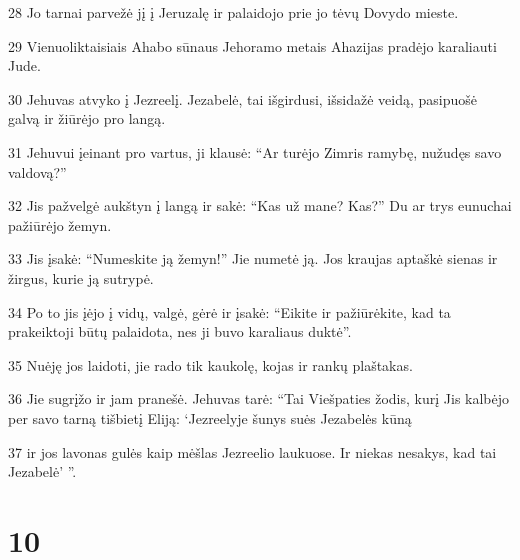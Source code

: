 \par 28 Jo tarnai parvežė jį į Jeruzalę ir palaidojo prie jo tėvų Dovydo mieste. 
\par 29 Vienuoliktaisiais Ahabo sūnaus Jehoramo metais Ahazijas pradėjo karaliauti Jude. 
\par 30 Jehuvas atvyko į Jezreelį. Jezabelė, tai išgirdusi, išsidažė veidą, pasipuošė galvą ir žiūrėjo pro langą. 
\par 31 Jehuvui įeinant pro vartus, ji klausė: “Ar turėjo Zimris ramybę, nužudęs savo valdovą?” 
\par 32 Jis pažvelgė aukštyn į langą ir sakė: “Kas už mane? Kas?” Du ar trys eunuchai pažiūrėjo žemyn. 
\par 33 Jis įsakė: “Numeskite ją žemyn!” Jie numetė ją. Jos kraujas aptaškė sienas ir žirgus, kurie ją sutrypė. 
\par 34 Po to jis įėjo į vidų, valgė, gėrė ir įsakė: “Eikite ir pažiūrėkite, kad ta prakeiktoji būtų palaidota, nes ji buvo karaliaus duktė”. 
\par 35 Nuėję jos laidoti, jie rado tik kaukolę, kojas ir rankų plaštakas. 
\par 36 Jie sugrįžo ir jam pranešė. Jehuvas tarė: “Tai Viešpaties žodis, kurį Jis kalbėjo per savo tarną tišbietį Eliją: ‘Jezreelyje šunys suės Jezabelės kūną 
\par 37 ir jos lavonas gulės kaip mėšlas Jezreelio laukuose. Ir niekas nesakys, kad tai Jezabelė’ ”.



\chapter{10}



